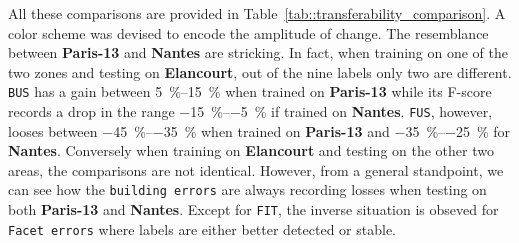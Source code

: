         All these comparisons are provided in Table~\ref{tab::transferability_comparison}.
        A color scheme was devised to encode the amplitude of change.
        The resemblance between \textbf{Paris-13} and \textbf{Nantes} are stricking.
        In fact, when training on one of the two zones and testing on \textbf{Elancourt}, out of the nine labels only two are different.
        \texttt{BUS} has a gain between \SIrange[range-phrase={ and }]{5}{15}{\percent} when trained on \textbf{Paris-13} while its F-score records a drop in the range \SIrange{-15}{-5}{\percent} if trained on \textbf{Nantes}.
        \texttt{FUS}, however, looses between \SIrange[range-phrase={ and }]{-45}{-35}{\percent} when trained on \textbf{Paris-13} and \SIrange[range-phrase={ and }]{-35}{-25}{\percent} for \textbf{Nantes}.
        Conversely when training on \textbf{Elancourt} and testing on the other two areas, the comparisons are not identical.
        However, from a general standpoint, we can see how the \texttt{building errors} are always recording losses when testing on both \textbf{Paris-13} and \textbf{Nantes}.
        Except for \texttt{FIT}, the inverse situation is obseved for \texttt{Facet errors} where labels are either better detected or stable.\\


